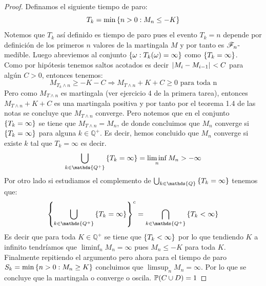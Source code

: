 \documentclass[a5paper,oneside]{amsart}
\theoremstyle{plain}
\theoremstyle{definition}
\begin{document}
\begin{proof}
Definamos el siguiente tiempo de paro:
$$
T_k=\min{\ensuremath{\left\{ n>0: M_n\leq -K\right\} }}
$$
Notemos que $T_k$ as\'i definido es tiempo  de paro pues el evento $T_k=n$ depende por definici\'on de los primeros $n$ valores de la martingala  $M$ y por tanto es $\mathscr{F}_n$-medible. Luego abreviemos al conjunto $\left\{ \omega: T_k(\omega)=\infty\right\} $ como $\left\{ T_k=\infty\right\} $.\\
Como por hip\'otesis tenemos saltos acotados es decir  $\hspace{.25mm}\left|M_i-M_{i-1}\right|\hspace{.25mm} < C$ para alg\'un $C>0$, entonces tenemos:
$$
M_{T_k\wedge n}\geq -K-C  \Rightarrow M_{T\wedge n} + K + C \geq  0 \text{ para toda n}
$$
Pero como $M_{T\wedge n} $ es martingala  (ver ejercicio 4 de la primera tarea), entonces $M_{T\wedge n} + K + C$  es una martingala positiva y por tanto por el teorema 1.4 de las notas se concluye que  $M_{T\wedge n}$   converge. Pero notemos que en el  conjunto  $\left\{ T_k=\infty\right\} $ se tiene que $M_{T\wedge n}=M_{n}$, de donde concluimos que $M_n$ converge si  $\left\{ T_k=\infty\right\} $  para alguna $k \in \mathds{Q^+}$. Es decir, hemos concluido que $M_n$ converge si existe $k$ tal que $T_k=\infty$ es decir.
$$
\bigcup_{k \in \mathds{Q^+}}\set{T_k=\infty}=\liminf_n{M_n}>-\infty
$$ 
Por otro lado si estudiamos el complemento de $\bigcup_{k \in \mathds{Q}}\set{T_k=\infty}$ tenemos que:
$$
\set{\bigcup_{k \in \mathds{Q^+}}\set{T_k=\infty}}^c=\bigcap_{k\in \mathds{Q^+}}\set{T_k < \infty}
$$
Es decir que para toda $K \in \mathds{Q^+}$ se tiene que $\left\{ T_k < \infty\right\} $ por lo que tendiendo $K$ a infinito tendr\'iamos que $\liminf_n{M_n}=\infty$ pues $M_n \leq -K$ para toda $K$. Finalmente repitiendo el argumento pero ahora para el tiempo de paro $S_k=\min{\ensuremath{\left\{ n>0: M_n \geq K\right\} }}$ concluimos que $\limsup_n{M_n}=\infty$. Por lo que se concluye que la martingala o converge o oscila. $ \mathbb{P} (C\cup D)=1$


\end{proof}
\end{document}
